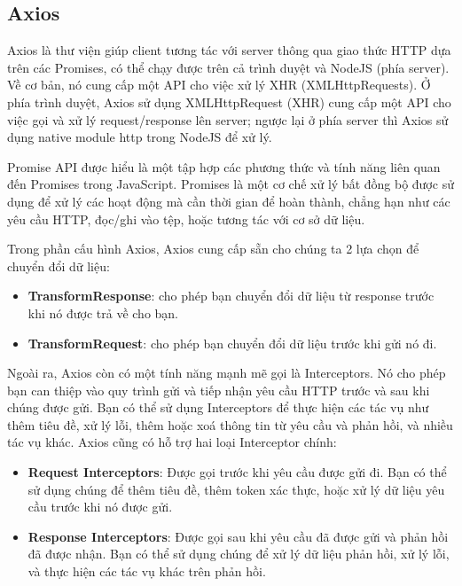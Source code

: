 \subsection{Axios}
Axios là thư viện giúp client tương tác với server thông qua giao thức HTTP dựa trên các Promises, có thể chạy được trên cả trình duyệt và NodeJS (phía server). Về cơ bản, nó cung cấp một API cho việc xử lý XHR (XMLHttpRequests). Ở phía trình duyệt, Axios sử dụng XMLHttpRequest (XHR) cung cấp một API cho việc gọi và xử lý request/response lên server; ngược lại ở phía server thì Axios sử dụng native module http trong NodeJS để xử lý.

Promise API được hiểu là một tập hợp các phương thức và tính năng liên quan đến Promises trong JavaScript. Promises là một cơ chế xử lý bất đồng bộ được sử dụng để xử lý các hoạt động mà cần thời gian để hoàn thành, chẳng hạn như các yêu cầu HTTP, đọc/ghi vào tệp, hoặc tương tác với cơ sở dữ liệu.

Trong phần cấu hình Axios, Axios cung cấp sẵn cho chúng ta 2 lựa chọn để chuyển đổi dữ liệu:

\begin{itemize}
    \item \textbf{TransformResponse}: cho phép bạn chuyển đổi dữ liệu từ response trước khi nó được trả về cho bạn.
    \item \textbf{TransformRequest}: cho phép bạn chuyển đổi dữ liệu trước khi gửi nó đi.
\end{itemize}

Ngoài ra, Axios còn có một tính năng mạnh mẽ gọi là Interceptors. Nó cho phép bạn can thiệp vào quy trình gửi và tiếp nhận yêu cầu HTTP trước và sau khi chúng được gửi. Bạn có thể sử dụng Interceptors để thực hiện các tác vụ như thêm tiêu đề, xử lý lỗi, thêm hoặc xoá thông tin từ yêu cầu và phản hồi, và nhiều tác vụ khác.
Axios cũng có hỗ trợ hai loại Interceptor chính:
\begin{itemize}
    \item \textbf{Request Interceptors}: Được gọi trước khi yêu cầu được gửi đi. Bạn có thể sử dụng chúng để thêm tiêu đề, thêm token xác thực, hoặc xử lý dữ liệu yêu cầu trước khi nó được gửi.
    \item \textbf{Response Interceptors}: Được gọi sau khi yêu cầu đã được gửi và phản hồi đã được nhận. Bạn có thể sử dụng chúng để xử lý dữ liệu phản hồi, xử lý lỗi, và thực hiện các tác vụ khác trên phản hồi.
\end{itemize}
 
